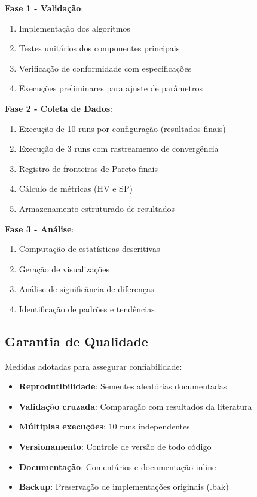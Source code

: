 \textbf{Fase 1 - Validação}:
\begin{enumerate}
    \item Implementação dos algoritmos
    \item Testes unitários dos componentes principais
    \item Verificação de conformidade com especificações
    \item Execuções preliminares para ajuste de parâmetros
\end{enumerate}

\textbf{Fase 2 - Coleta de Dados}:
\begin{enumerate}
    \item Execução de 10 runs por configuração (resultados finais)
    \item Execução de 3 runs com rastreamento de convergência
    \item Registro de fronteiras de Pareto finais
    \item Cálculo de métricas (HV e SP)
    \item Armazenamento estruturado de resultados
\end{enumerate}

\textbf{Fase 3 - Análise}:
\begin{enumerate}
    \item Computação de estatísticas descritivas
    \item Geração de visualizações
    \item Análise de significância de diferenças
    \item Identificação de padrões e tendências
\end{enumerate}

\subsection{Garantia de Qualidade}

Medidas adotadas para assegurar confiabilidade:

\begin{itemize}
    \item \textbf{Reprodutibilidade}: Sementes aleatórias documentadas
    \item \textbf{Validação cruzada}: Comparação com resultados da literatura
    \item \textbf{Múltiplas execuções}: 10 runs independentes
    \item \textbf{Versionamento}: Controle de versão de todo código
    \item \textbf{Documentação}: Comentários e documentação inline
    \item \textbf{Backup}: Preservação de implementações originais (.bak)
\end{itemize}


